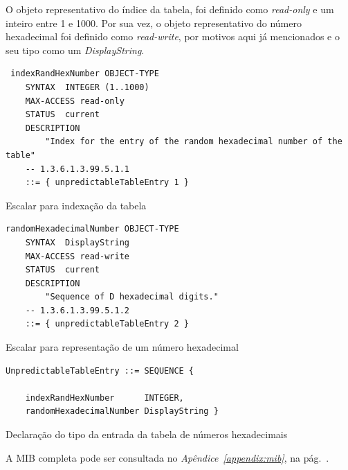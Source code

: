 O objeto representativo do índice da tabela, foi definido como \emph{read-only}
e um inteiro entre 1 e 1000. Por sua vez, o objeto representativo do número
hexadecimal foi definido como \emph{read-write}, por motivos aqui já mencionados
e o seu tipo como um \emph{DisplayString}. 

\begin{center}

\begin{verbatim}
 indexRandHexNumber OBJECT-TYPE
	SYNTAX  INTEGER (1..1000)
	MAX-ACCESS read-only
	STATUS  current
	DESCRIPTION
		"Index for the entry of the random hexadecimal number of the table"
	-- 1.3.6.1.3.99.5.1.1
	::= { unpredictableTableEntry 1 }
\end{verbatim}
 	\captionsetup{type=figure, width=0.8\linewidth}
	\caption{Escalar para indexação da tabela}
\label{fig:fasea:} 
\end{center}
\newpage
\begin{center}
 	
\begin{verbatim}
randomHexadecimalNumber OBJECT-TYPE
	SYNTAX  DisplayString
	MAX-ACCESS read-write
	STATUS  current
	DESCRIPTION
		"Sequence of D hexadecimal digits."
	-- 1.3.6.1.3.99.5.1.2
	::= { unpredictableTableEntry 2 }
\end{verbatim}
 	\captionsetup{type=figure, width=0.8\linewidth}
	\caption{Escalar para representação de um número hexadecimal}
\label{fig:fasea:} 
\end{center}

\begin{center}
 	
 \begin{verbatim}
UnpredictableTableEntry ::= SEQUENCE {

	indexRandHexNumber      INTEGER,
	randomHexadecimalNumber DisplayString }
\end{verbatim}
 	\captionsetup{type=figure, width=0.8\linewidth}
	\caption{Declaração do tipo da entrada da tabela de números hexadecimais}
\label{fig:fasea:} 
\end{center}

A MIB completa pode ser consultada no \emph{Apêndice~\ref{appendix:mib}}, na pág.~\pageref{appendix:mib}.










